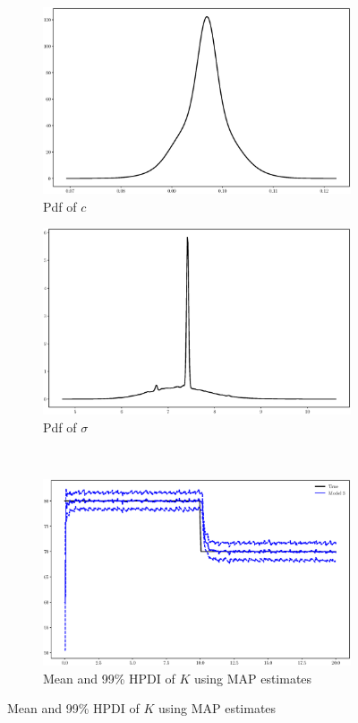 \documentclass[]{elsarticle}
\begin{document}
\begin{figure}[!htb]
\centering
\begin{subfigure}{.49\textwidth}
\includegraphics[width=\linewidth,keepaspectratio]{./figs/Case00/Model3_c.eps}
\caption{Pdf of $c$}
\end{subfigure}
\begin{subfigure}{.49\textwidth}
\centering
\includegraphics[width=\linewidth,keepaspectratio]{./figs/Case00/Model3_sigma.eps}
\caption{Pdf of $\sigma$}
\label{fig:s1c}
\end{subfigure}\\
\begin{subfigure}{.99\textwidth}
\centering
\includegraphics[width=\linewidth,keepaspectratio]{./figs/Case00/Model3_k_estimate.eps}
\caption{Mean and 99\% HPDI of $K$ using MAP estimates}
\label{fig:s1d}
\end{subfigure}
\end{figure}
\end{document}
